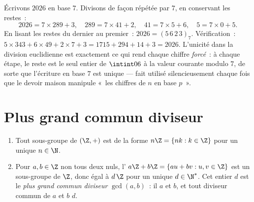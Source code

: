 \begin{example}\label{ex:b1:arith:base7}
Écrivons $2026$ en base $7$. Divisons de façon répétée par $7$, en
conservant les restes~:
\[
2026 = 7 \times 289 + 3, \quad
289 = 7 \times 41 + 2, \quad
41 = 7 \times 5 + 6, \quad
5 = 7 \times 0 + 5 .
\]
En lisant les restes du dernier au premier~: $2026 =
(5\,6\,2\,3)_7$. Vérification~: $5 \times 343 + 6 \times 49 + 2 \times 7
+ 3 = 1715 + 294 + 14 + 3 = 2026$. L'unicité dans la division
euclidienne est exactement ce qui rend chaque chiffre \emph{forcé}~: à
chaque étape, le reste est le seul entier de $\intint06$ 
à la valeur courante modulo $7$, de sorte que l'écriture en base $7$ est
unique --- fait utilisé silencieusement chaque fois que le devoir maison
manipule «~les chiffres de $n$ en base $p$~».
\end{example}

\section{Plus grand commun diviseur}

\begin{theorem}\label{thm:b1:arith:gcd}
\begin{enumerate}
  \item Tout sous-groupe de $(\Z, +)$ est de la forme $n\Z = \{nk : k
        \in \Z\}$ pour un unique $n \in \N$.
  \item Pour $a, b \in \Z$ non tous deux nuls, l' $a\Z + b\Z = \{au +
        bv : u, v \in \Z\}$ est un sous-groupe de $\Z$, donc égal à
        $d\,\Z$ pour un unique $d \in \N^*$. Cet entier $d$ est le
        \emph{plus grand commun diviseur}
        $\gcd(a, b)$~: il  $a$ et $b$, et tout diviseur
        commun de $a$ et $b$  $d$.
\end{enumerate}
\end{theorem}

